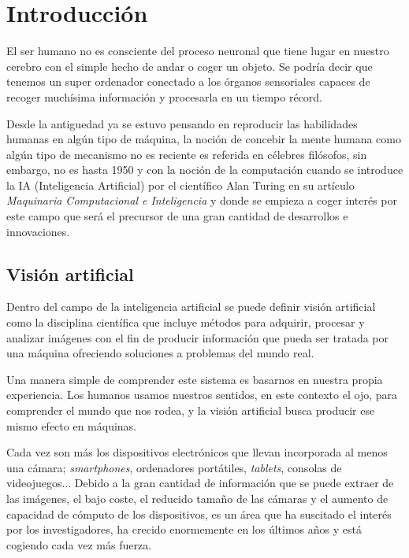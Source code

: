 
\chapter{Introducción} %

\label{Chapter1} %

El ser humano no es consciente del proceso neuronal que tiene lugar en nuestro cerebro con el simple hecho de andar o coger un objeto. Se podría decir que tenemos un super ordenador conectado a los órganos sensoriales capaces de recoger muchísima información y procesarla en un tiempo récord.

Desde la antiguedad ya se estuvo pensando en reproducir las habilidades humanas en algún tipo de máquina, la noción de concebir la mente humana como algún tipo de mecanismo no es reciente es referida en célebres filósofos, sin embargo, no es hasta 1950 y con la noción de la computación cuando se introduce la IA (Inteligencia Artificial) por el científico Alan Turing en su artículo \textit{Maquinaria Computacional e Inteligencia} y donde se empieza a coger interés por este campo que será el precursor de una gran cantidad de desarrollos e innovaciones.

\section{Visión artificial}

Dentro del campo de la inteligencia artificial se puede definir visión artificial como la disciplina científica que incluye métodos para adquirir, procesar y analizar imágenes con el fin de producir información que pueda ser tratada por una máquina ofreciendo soluciones a problemas del mundo real.

Una manera simple de comprender este sistema es basarnos en nuestra propia experiencia. Los humanos usamos nuestros sentidos, en este contexto el ojo, para comprender el mundo que nos rodea, y la visión artificial busca producir ese mismo efecto en máquinas.

Cada vez son más los dispositivos electrónicos que llevan incorporada al menos una cámara; \textit{smartphones}, ordenadores portátiles, \textit{tablets}, consolas de videojuegos... Debido a la gran cantidad de información que se puede extraer de las imágenes, el bajo coste, el reducido tamaño de las cámaras y el aumento de capacidad de cómputo de los dispositivos, es un área que ha suscitado el interés por los investigadores, ha crecido enormemente en los últimos años y está cogiendo cada vez más fuerza.

